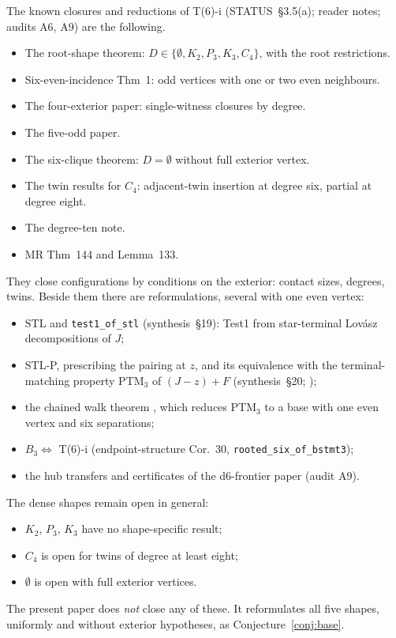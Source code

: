 \documentclass[11pt]{amsart}
\theoremstyle{definition}
\newcommand{\STL}{\mathrm{STL}}
\begin{document}
The known closures and reductions of T(6)-i (STATUS~\S3.5(a); reader notes; audits A6, A9) are
the following.
\begin{itemize}
\item The root-shape theorem: $D\in\{\emptyset,K_2,P_3,K_3,C_4\}$, with the root restrictions.
\item Six-even-incidence Thm~1: odd vertices with one or two even neighbours.
\item The four-exterior paper: single-witness closures by degree.
\item The five-odd paper.
\item The six-clique theorem: $D=\emptyset$ without full exterior vertex.
\item The twin results for $C_4$: adjacent-twin insertion at degree six, partial at degree eight.
\item The degree-ten note.
\item MR Thm~144 and Lemma~133.
\end{itemize}
They close configurations by conditions on the exterior: contact sizes, degrees, twins. Beside
them there are reformulations, several with one even vertex:
\begin{itemize}
\item $\STL$ and \texttt{test1\_of\_stl} \cite{STL} (synthesis~\S19): Test1 from star-terminal
Lov\'asz decompositions of $J$;
\item STL-P, prescribing the pairing at $z$, and its equivalence with the terminal-matching
property PTM$_3$ of $(J-z)+F$ (synthesis~\S20; \cite{TM});
\item the chained walk theorem \cite[Thm~8.2]{TM}, which reduces PTM$_3$ to a base with one even
vertex and six separations;
\item $B_3\Leftrightarrow$ T(6)-i (endpoint-structure Cor.~30, \texttt{rooted\_six\_of\_bstmt3});
\item the hub transfers and certificates of the d6-frontier paper (audit A9).
\end{itemize}
The dense shapes remain open in general:
\begin{itemize}
\item $K_2$, $P_3$, $K_3$ have no shape-specific result;
\item $C_4$ is open for twins of degree at least eight;
\item $\emptyset$ is open with full exterior vertices.
\end{itemize}
The present paper does \emph{not} close any of these. It reformulates all five shapes,
uniformly and without exterior hypotheses, as Conjecture~\ref{conj:base}.
\end{document}
